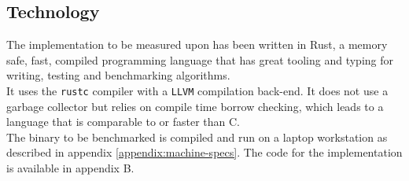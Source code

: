 \subsection{Technology}
The implementation to be measured upon has been written in Rust, a memory safe, fast, compiled programming language\cite{rust-lang} that has great tooling and typing for writing, testing and benchmarking algorithms.\\
It uses the \texttt{rustc} compiler with a \texttt{LLVM} compilation back-end. It does not use a garbage collector but relies on compile time borrow checking, which leads to a language that is comparable to or faster than C\cite{highleveldrivers}.\\
The binary to be benchmarked is compiled and run on a laptop workstation as described in appendix \ref{appendix:machine-specs}.
The code for the implementation is available in appendix B.
